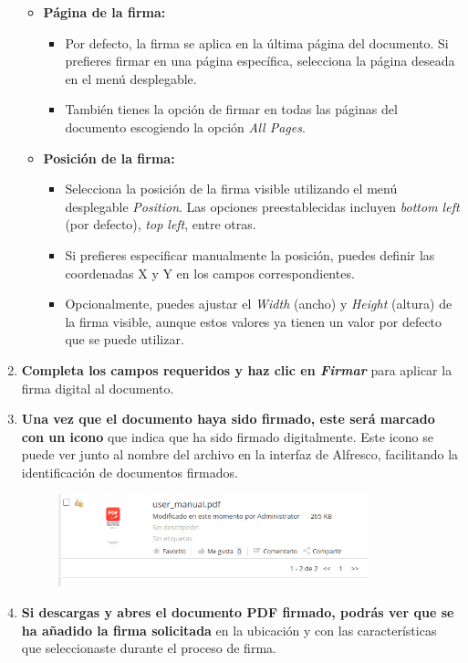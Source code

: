 \documentclass{template/ol-softwaremanual}
\begin{document}
\begin{enumerate}
\begin{itemize}
		\item \textbf{Página de la firma:}
		\begin{itemize}
			\item Por defecto, la firma se aplica en la última página del documento. Si prefieres firmar en una página específica, selecciona la página deseada en el menú desplegable.
			\item También tienes la opción de firmar en todas las páginas del documento escogiendo la opción \textit{All Pages}.
		\end{itemize}
		
		\item \textbf{Posición de la firma:}
		\begin{itemize}
			\item Selecciona la posición de la firma visible utilizando el menú desplegable \textit{Position}. Las opciones preestablecidas incluyen \textit{bottom left} (por defecto), \textit{top left}, entre otras.
			\item Si prefieres especificar manualmente la posición, puedes definir las coordenadas X y Y en los campos correspondientes.
			\item Opcionalmente, puedes ajustar el \textit{Width} (ancho) y \textit{Height} (altura) de la firma visible, aunque estos valores ya tienen un valor por defecto que se puede utilizar.
		\end{itemize}
	\end{itemize}
	
	\item \textbf{Completa los campos requeridos y haz clic en \textit{Firmar}} para aplicar la firma digital al documento.
	\item \textbf{Una vez que el documento haya sido firmado, este será marcado con un icono} que indica que ha sido firmado digitalmente. Este icono se puede ver junto al nombre del archivo en la interfaz de Alfresco, facilitando la identificación de documentos firmados.
	\begin{figure}[h]
		\centering
		\includegraphics[width=0.85\textwidth]{images/signed-doc}
		\label{fig:etiqueta_imagen}
	\end{figure}
	\item \textbf{Si descargas y abres el documento PDF firmado, podrás ver que se ha añadido la firma solicitada} en la ubicación y con las características que seleccionaste durante el proceso de firma.
\end{enumerate}
\end{document}
